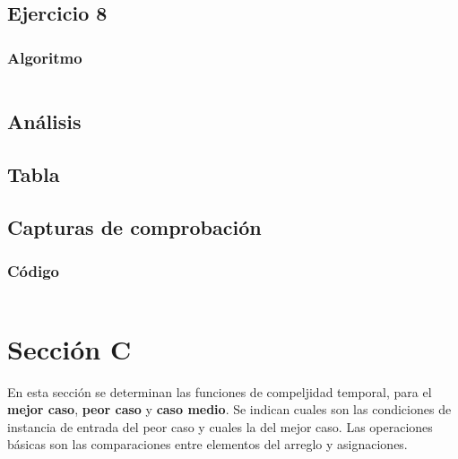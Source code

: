 \documentclass[12pt, letterpaper]{article}			%
\begin{document}
	    \subsection{Ejercicio 8}

			\subsubsection{Algoritmo}	    
    			\begin{lstlisting}[style=Java]
    		    \end{lstlisting}		
    		
    		\subsection{Análisis}

    		\subsection{Tabla}
	        
	        \subsection{Capturas de comprobación}

	        \subsubsection{Código}
	            \begin{lstlisting}[style=Java]
    		    \end{lstlisting}

	\section{Sección C}
	En esta sección se determinan las funciones de compeljidad temporal, para el \textbf{mejor caso}, \textbf{peor caso} y \textbf{caso medio}. Se indican cuales son las condiciones de instancia de entrada del peor caso y cuales la del mejor caso.
	Las operaciones básicas son las comparaciones entre elementos del arreglo y asignaciones.
\end{document}
